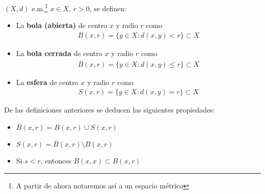 \begin{definicion}
    $(X,d)$ e.m.\footnote{A partir de ahora notaremos así a un espacio métrico} $x \in X$, $r >0$, se definen:

    \begin{itemize}
        \item La \textbf{bola (abierta)} de centro $x$ y radio $r$ como 
        \begin{gather*}
            B(x, r) = \{y \in X : d(x,y) < r\} \subset X
        \end{gather*}
        \item La \textbf{bola cerrada} de centro $x$ y radio $r$ como 
        \begin{gather*}
            \overline{B}(x, r) = \{y \in X : d(x,y) \leq r\} \subset X
        \end{gather*}
        \item La \textbf{esfera} de centro $x$ y radio $r$ como 
        \begin{gather*}
            S(x, r) = \{y \in X : d(x,y) = r\} \subset X
        \end{gather*}
    \end{itemize}
    \endsquare
\end{definicion}

\begin{propiedades} De las definiciones anteriores se deducen las siguientes propiedades:
    \begin{itemize}
        \item $\overline{B}(x, r) = B(x,r) \cup S(x,r)$
        \item $S(x,r) = \overline{B}(x, r) \setminus B(x,r)$
        \item Si $s<r$, entonces $\overline{B}(x, x) \subset B(x,r)$
    \end{itemize}
    \endsquare
\end{propiedades}

